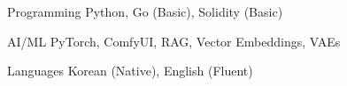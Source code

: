

\begin{cvskills}

  \cvskill
    {Programming} %
    {Python, Go (Basic), Solidity (Basic)} %

  \cvskill
    {AI/ML} %
    {PyTorch, ComfyUI, RAG, Vector Embeddings, VAEs} %

  \cvskill
    {Languages} %
    {Korean (Native), English (Fluent)} %

\end{cvskills}
